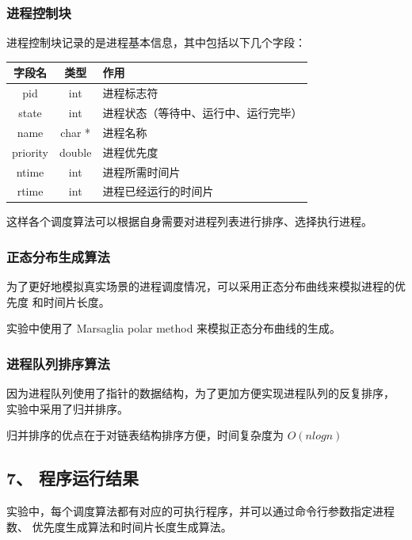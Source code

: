 \documentclass[12bp]{guo}
\begin{document}
\subsubsection{进程控制块}

进程控制块记录的是进程基本信息，其中包括以下几个字段：

\begin{table}[H]
    \centering
    \begin{tabular}{| c | c | l |}
        \hline
        字段名 & 类型 & 作用 \\ \hline
        pid & int & 进程标志符 \\
        state & int & 进程状态（等待中、运行中、运行完毕） \\
        name & char * & 进程名称 \\
        priority & double & 进程优先度 \\
        ntime & int & 进程所需时间片\\
        rtime & int & 进程已经运行的时间片 \\ \hline
    \end{tabular}
\end{table}

这样各个调度算法可以根据自身需要对进程列表进行排序、选择执行进程。

\subsubsection{正态分布生成算法}

为了更好地模拟真实场景的进程调度情况，可以采用正态分布曲线来模拟进程的优先度
和时间片长度。


实验中使用了 Marsaglia polar method 来模拟正态分布曲线的生成。

\subsubsection{进程队列排序算法}

因为进程队列使用了指针的数据结构，为了更加方便实现进程队列的反复排序，
实验中采用了归并排序。


归并排序的优点在于对链表结构排序方便，时间复杂度为 $ O(n log n) $


\subsection{7、 程序运行结果}

实验中，每个调度算法都有对应的可执行程序，并可以通过命令行参数指定进程数、
优先度生成算法和时间片长度生成算法。
\end{document}
